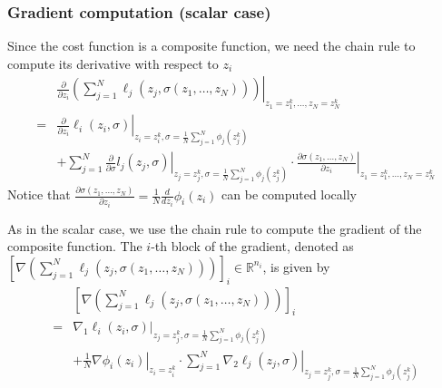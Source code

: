 \documentclass{book}
\newcommand{\R}{\mathbb{R}}
\theoremstyle{theoremv2}
\theoremstyle{defv2}
\theoremstyle{remark}
\theoremstyle{remark}
\theoremstyle{definition}
\theoremstyle{definition}
\begin{document}
\subsubsection{Gradient computation (scalar case)}
Since the cost function is a composite function, we need the chain rule to compute its derivative with respect to $z_i$ 
\begin{align*}
    &\displaystyle\frac{\partial}{\partial z_i}\left.\left(\displaystyle\sum_{j=1}^{N}\ell_j(z_j,\sigma(z_1,\dots,z_N))\right)\right|_{z_1 = z_1^k,\dots,z_N = z_N^k} \\
    =& \left.\displaystyle\frac{\partial}{\partial z_i} \ell_i(z_i,\sigma)\right|_{z_i=z_i^k, \sigma=\frac{1}{N}\sum_{j=1}^{N}\phi_j(z_j^k)}  \\
    &+\left. \sum_{j=1}^{N}\displaystyle\frac{\partial}{\partial\sigma}l_j(z_j,\sigma)\right|_{z_j=z_j^k, \sigma=\frac{1}{N}\sum_{j=1}^{N}\phi_j(z_j^k)}\cdot \left.\displaystyle\frac{\partial\sigma(z_1,\dots,z_N)}{\partial z_i}\right|_{z_1=z_1^k,\dots,z_N = z_N^k}
\end{align*}
Notice that $\displaystyle\frac{\partial\sigma(z_1,\dots,z_N)}{\partial z_i}=\displaystyle\frac{1}{N}\displaystyle\frac{d}{d z_i}\phi_i(z_i)$ can be computed locally

As in the scalar case, we use the chain rule to compute the gradient of the composite function. The $i$-th block of the gradient, denoted as $\left[\nabla\left(\displaystyle\sum_{j=1}^{N}\ell_j(z_j,\sigma(z_1,\dots,z_N))\right)\right]_i\in\R^{n_i}$, is given by
\begin{align*}
    &\left[\nabla\left(\displaystyle\sum_{j=1}^{N}\ell_j(z_j,\sigma(z_1,\dots,z_N))\right)\right]_i \\ 
    =& \left.\nabla_1\ell_i(z_i,\sigma)\right|_{z_j=z_j^k, \sigma=\frac{1}{N}\sum_{j=1}^{N}\phi_j(z_j^k)} \\ 
    &+ \left.\displaystyle\frac{1}{N}\nabla \phi_i(z_i)\right|_{z_i=z_i^k}\cdot \left.\displaystyle\sum_{j=1}^{N}\nabla_2 \ell_j(z_j,\sigma)\right|_{z_j=z_j^k, \sigma=\frac{1}{N}\sum_{j=1}^{N}\phi_j(z_j^k)}
\end{align*}
\end{document}
